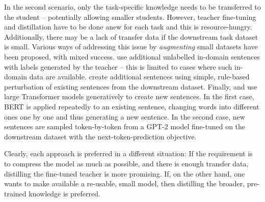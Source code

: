 \documentclass[bsc,frontabs,twoside,singlespacing,parskip,deptreport]{infthesis}
\begin{document}
{{{      %

      In the second scenario, only the task-specific knowledge needs to be transferred to the student -- potentially allowing smaller students.
      However, teacher fine-tuning and distillation have to be done anew for each task and this is resource-hungry.
      Additionally, there may be a lack of transfer data if the downstream task dataset is small.
      Various ways of addressing this issue by \textit{augmenting} small datasets have been proposed, with mixed success. 
      \citet{Mukherjee_2019} use additional unlabelled in-domain sentences with labels generated by the teacher -- this is limited to cases where such in-domain data are available. \citet{Tang_2019a} create additional sentences using simple, rule-based perturbation of existing sentences from the downstream dataset. Finally, \citet{Jiao_2019} and \citet{Tang_2019b} use large Transformer models generatively to create new sentences. In the first case, BERT is applied repeatedly to an existing sentence, changing words into different ones one by one and thus generating a new sentence. In the second case, new sentences are sampled token-by-token from a GPT-2 model fine-tuned on the downstream dataset with the next-token-prediction objective.

      Clearly, each approach is preferred in a different situation: If the requirement is to compress the model as much as possible, and there is enough transfer data, distilling the fine-tuned teacher is more promising. If, on the other hand, one wants to make available a re-usable, small model, then distilling the broader, pre-trained knowledge is preferred.
    }
  }
  
}
\end{document}
